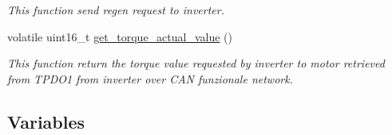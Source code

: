 \begin{DoxyCompactItemize}
\begin{DoxyCompactList}\small\item\em This function send regen request to inverter. \end{DoxyCompactList}\item 
volatile uint16\+\_\+t \mbox{\hyperlink{group___c_a_n__funzionale__group_ga3c4828f57a818b8e1b2f277c2174b5da}{get\+\_\+torque\+\_\+actual\+\_\+value}} ()
\begin{DoxyCompactList}\small\item\em This function return the torque value requested by inverter to motor retrieved from T\+P\+D\+O1 from inverter over C\+AN funzionale network. \end{DoxyCompactList}\end{DoxyCompactItemize}
\subsection*{Variables}
